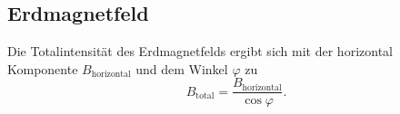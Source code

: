 \subsection{Erdmagnetfeld}

Die Totalintensität des Erdmagnetfelds ergibt sich mit der horizontal Komponente $B_\text{horizontal}$ und dem Winkel $\varphi$ zu %
\begin{equation}
    B_\text{total} = \frac{B_\text{horizontal}}{\cos{\varphi}}.
    \label{eqn:btotal}
\end{equation}
